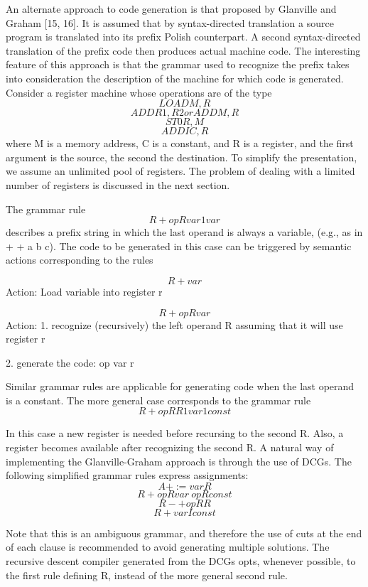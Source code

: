 

An alternate approach to code generation is that proposed by Glanville and
Graham [15, 16]. It is assumed that by syntax-directed translation a source
program is translated into its prefix Polish counterpart. A second syntax-directed
translation of the prefix code then produces actual machine code. The interesting
feature of this approach is that the grammar used to recognize the prefix takes
into consideration the description of the machine for which code is generated.
Consider a register machine whose operations are of the type
\[LOAD M, R\]
\[ADD R1, R2 or ADD M, R\]
\[ST0 R, M\]
\[ADDI C, R\]
where M is a memory address, C is a constant, and R is a register, and the first
argument is the source, the second the destination. To simplify the presentation,
we assume an unlimited pool of registers. The problem of dealing with a limited
number of registers is discussed in the next section.

The grammar rule
\[R + op R var 1 var\]
describes a prefix string in which the last operand is always a variable, (e.g., as
in + + a b c). The code to be generated in this case can be triggered by semantic
actions corresponding to the rules 

\[R + var\]
Action: Load variable into register r

\[R + op R var\]
Action: 1. recognize (recursively) the left operand R assuming that it will
use register r

2. generate the code: op var r

Similar grammar rules are applicable for generating code when the last operand
is a constant. The more general case corresponds to the grammar rule
\[R + op R R 1 var 1 const\]

In this case a new register is needed before recursing to the second R. Also, a
register becomes available after recognizing the second R. A natural way of
implementing the Glanville-Graham approach is through the use of DCGs. The
following simplified grammar rules express assignments:
\[A + := var R\]
\[R+opRvar~opRconst\]
\[R-+opRR\]
\[R + var I const\]

Note that this is an ambiguous grammar, and therefore the use of cuts at the end
of each clause is recommended to avoid generating multiple solutions. The
recursive descent compiler generated from the DCGs opts, whenever possible, to
the first rule defining R, instead of the more general second rule. 


